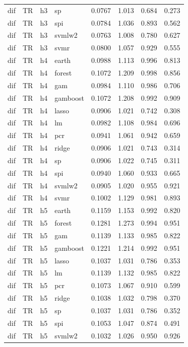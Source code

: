 \begin{ThreePartTable}
\begin{longtable}[t]{llclcccc}
dif & TR & h3 & sp & 0.0767 & 1.013 & 0.684 & 0.273\\
dif & TR & h3 & spi & 0.0784 & 1.036 & 0.893 & 0.562\\
dif & TR & h3 & svmlw2 & 0.0763 & 1.008 & 0.780 & 0.627\\
dif & TR & h3 & svmr & 0.0800 & 1.057 & 0.929 & 0.555\\
\addlinespace
dif & TR & h4 & earth & 0.0988 & 1.113 & 0.996 & 0.813\\
dif & TR & h4 & forest & 0.1072 & 1.209 & 0.998 & 0.856\\
dif & TR & h4 & gam & 0.0984 & 1.110 & 0.986 & 0.706\\
dif & TR & h4 & gamboost & 0.1072 & 1.208 & 0.992 & 0.909\\
dif & TR & h4 & lasso & 0.0906 & 1.021 & 0.742 & 0.308\\
dif & TR & h4 & lm & 0.0982 & 1.108 & 0.984 & 0.696\\
dif & TR & h4 & pcr & 0.0941 & 1.061 & 0.942 & 0.659\\
dif & TR & h4 & ridge & 0.0906 & 1.021 & 0.743 & 0.314\\
dif & TR & h4 & sp & 0.0906 & 1.022 & 0.745 & 0.311\\
dif & TR & h4 & spi & 0.0940 & 1.060 & 0.933 & 0.665\\
dif & TR & h4 & svmlw2 & 0.0905 & 1.020 & 0.955 & 0.921\\
dif & TR & h4 & svmr & 0.1002 & 1.129 & 0.981 & 0.893\\
\addlinespace
dif & TR & h5 & earth & 0.1159 & 1.153 & 0.992 & 0.820\\
dif & TR & h5 & forest & 0.1281 & 1.273 & 0.994 & 0.951\\
dif & TR & h5 & gam & 0.1139 & 1.133 & 0.985 & 0.822\\
dif & TR & h5 & gamboost & 0.1221 & 1.214 & 0.992 & 0.951\\
dif & TR & h5 & lasso & 0.1037 & 1.031 & 0.786 & 0.353\\
dif & TR & h5 & lm & 0.1139 & 1.132 & 0.985 & 0.822\\
dif & TR & h5 & pcr & 0.1073 & 1.067 & 0.910 & 0.599\\
dif & TR & h5 & ridge & 0.1038 & 1.032 & 0.798 & 0.370\\
dif & TR & h5 & sp & 0.1037 & 1.031 & 0.786 & 0.352\\
dif & TR & h5 & spi & 0.1053 & 1.047 & 0.874 & 0.491\\
dif & TR & h5 & svmlw2 & 0.1032 & 1.026 & 0.950 & 0.926\\

\end{longtable}
\end{ThreePartTable}
